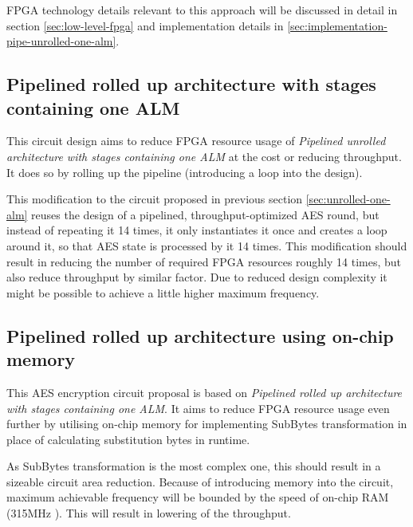 FPGA technology details relevant to this approach will be discussed in detail in section \ref{sec:low-level-fpga} and implementation details in \ref{sec:implementation-pipe-unrolled-one-alm}. 


\subsection{Pipelined rolled up architecture with stages containing one ALM}
This circuit design aims to reduce FPGA resource usage of \textit{Pipelined unrolled architecture with stages containing one ALM} at the cost or reducing throughput. It does so by rolling up the pipeline \cite[Chapter 2]{kilts2007advanced} (introducing a loop into the design).

This modification to the circuit proposed in previous section \ref{sec:unrolled-one-alm} reuses the design of a pipelined, throughput-optimized AES round, but instead of repeating it 14 times, it only instantiates it once and creates a loop around it, so that AES state is processed by it 14 times. This modification should result in reducing the number of required FPGA resources roughly 14 times, but also reduce throughput by similar factor. Due to reduced design complexity it might be possible to achieve a little higher maximum frequency.


\subsection{Pipelined rolled up architecture using on-chip memory}
This AES encryption circuit proposal is based on \textit{Pipelined rolled up architecture with stages containing one ALM}. It aims to reduce FPGA resource usage even further by utilising on-chip memory for implementing SubBytes transformation in place of calculating substitution bytes in runtime. 

As SubBytes transformation is the most complex one, this should result in a sizeable circuit area reduction. Because of introducing memory into the circuit, maximum achievable frequency will be bounded by the speed of on-chip RAM (315MHz \cite[Table 27]{cycloneVDatasheet}). This will result in lowering of the throughput.

